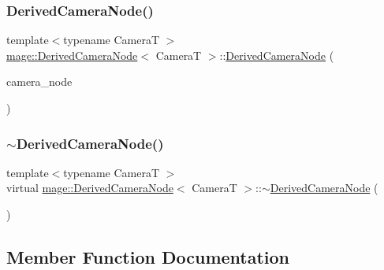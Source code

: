\subsubsection{\texorpdfstring{Derived\+Camera\+Node()}{DerivedCameraNode()}\hspace{0.1cm}{\footnotesize\ttfamily [4/4]}}
{\footnotesize\ttfamily template$<$typename CameraT $>$ \\
\hyperlink{classmage_1_1_derived_camera_node}{mage\+::\+Derived\+Camera\+Node}$<$ CameraT $>$\+::\hyperlink{classmage_1_1_derived_camera_node}{Derived\+Camera\+Node} (\begin{DoxyParamCaption}\item[{\hyperlink{classmage_1_1_derived_camera_node}{Derived\+Camera\+Node}$<$ CameraT $>$ \&\&}]{camera\+\_\+node }\end{DoxyParamCaption})}

\hypertarget{classmage_1_1_derived_camera_node_a74ab678b593c43b6bf95bb7fbfbd4d2d}{}\label{classmage_1_1_derived_camera_node_a74ab678b593c43b6bf95bb7fbfbd4d2d} 
\subsubsection{\texorpdfstring{$\sim$\+Derived\+Camera\+Node()}{~DerivedCameraNode()}}
{\footnotesize\ttfamily template$<$typename CameraT $>$ \\
virtual \hyperlink{classmage_1_1_derived_camera_node}{mage\+::\+Derived\+Camera\+Node}$<$ CameraT $>$\+::$\sim$\hyperlink{classmage_1_1_derived_camera_node}{Derived\+Camera\+Node} (\begin{DoxyParamCaption}{ }\end{DoxyParamCaption})\hspace{0.3cm}{\ttfamily [virtual]}}



\subsection{Member Function Documentation}
\hypertarget{classmage_1_1_derived_camera_node_a29e597fe2c9e0f37eeab8fec5330d764}{}\label{classmage_1_1_derived_camera_node_a29e597fe2c9e0f37eeab8fec5330d764} 
